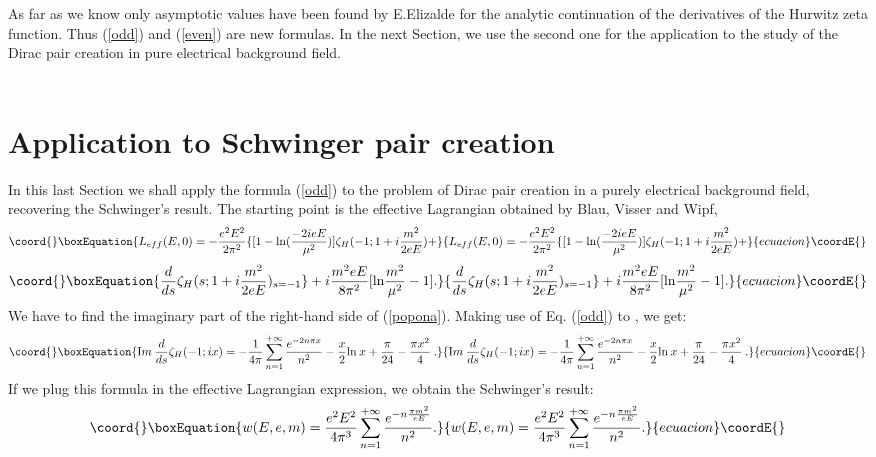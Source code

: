 \documentclass [11pt]{article}
\begin{document}
As far as we know only asymptotic values have been found by E.Elizalde
\cite{Elizalde:1993zg,19} for the analytic continuation of the 
 derivatives of the Hurwitz zeta function. Thus (\ref{odd}) and (\ref{even}) 
are new formulas. In the next Section, we use the second one for the application to 
the study of the Dirac pair creation in pure electrical background field.
\\
\\
\section{Application to Schwinger pair creation}

In this last Section we shall apply the formula (\ref{odd}) to the problem of 
Dirac pair creation in a purely electrical background field,
recovering the Schwinger's result.
The starting point is  the effective Lagrangian obtained by Blau, Visser and Wipf,
\begin{equation}\coord{}\boxEquation{\nonumber
\label{popona} L_{eff}(E,0)=-\frac{e^{2}E^{2}}{2\pi ^{2}}\{[1-\mbox{ln}(\frac{-2ieE}{\mu ^{2}})]\zeta _{H}(-1;1+i\frac{m^{2}}{2eE})+
}{\nonumber
L_{eff}(E,0)=-\frac{e^{2}E^{2}}{2\pi ^{2}}\{[1-\mbox{ln}(\frac{-2ieE}{\mu ^{2}})]\zeta _{H}(-1;1+i\frac{m^{2}}{2eE})+
}{ecuacion}\coordE{}\end{equation}
\begin{equation}\coord{}\boxEquation{
\frac{d}{ds}\zeta _{H}(s;1+i\frac{m^{2}}{2eE})_{s=-1}\}+i\frac{m^{2}eE}{8\pi ^{2}}[\mbox{ln}\frac{m^{2}}{\mu ^{2}}-1] .
}{
\frac{d}{ds}\zeta _{H}(s;1+i\frac{m^{2}}{2eE})_{s=-1}\}+i\frac{m^{2}eE}{8\pi ^{2}}[\mbox{ln}\frac{m^{2}}{\mu ^{2}}-1] .
}{ecuacion}\coordE{}\end{equation}
We have to find the imaginary part of the right-hand side of (\ref{popona}).
Making use of Eq.
(\ref{odd}) to \coordHE{}, we get:
\begin{equation}\coord{}\boxEquation{
\mbox Im \: \frac{d}{ds}\zeta_H(-1;ix)= -\frac{1}{4\pi}\sum_{n=1}^{+\infty}\frac{e^{-2n \pi x}}{n^{2}}
-\frac{x}{2}\mbox{ln} \:x
+\frac{\pi}{24}-\frac{\pi x^2}{4}\:.
}{
\mbox Im \: \frac{d}{ds}\zeta_H(-1;ix)= -\frac{1}{4\pi}\sum_{n=1}^{+\infty}\frac{e^{-2n \pi x}}{n^{2}}
-\frac{x}{2}\mbox{ln} \:x
+\frac{\pi}{24}-\frac{\pi x^2}{4}\:.
}{ecuacion}\coordE{}\end{equation}
If we plug this formula in the effective Lagrangian expression, 
we obtain the Schwinger's result:
\begin{equation}\coord{}\boxEquation{
w(E,e,m)=\frac{e^{2}E^{2}}{4\pi ^{3}}\sum _{n=1}^{+\infty }\frac{e^{-n\frac{\pi m^{2}}{eE}}}{n^{2}}.
}{
w(E,e,m)=\frac{e^{2}E^{2}}{4\pi ^{3}}\sum _{n=1}^{+\infty }\frac{e^{-n\frac{\pi m^{2}}{eE}}}{n^{2}}.
}{ecuacion}\coordE{}\end{equation}
\end{document}
